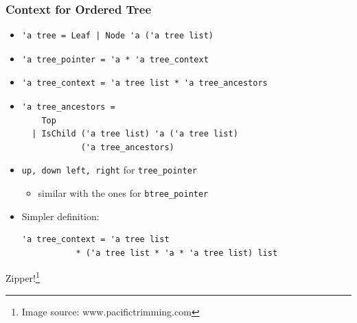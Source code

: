 \begin{frame}
\frametitle{Context for Ordered Tree}

\begin{itemize}
\item
\begin{lstlisting}
'a tree = Leaf | Node 'a ('a tree list)
\end{lstlisting}

\item
\begin{lstlisting}
'a tree_pointer = 'a * 'a tree_context
\end{lstlisting}

\item 
\begin{lstlisting}
'a tree_context = 'a tree list * 'a tree_ancestors
\end{lstlisting}

\item 
\begin{lstlisting}
'a tree_ancestors =
    Top
  | IsChild ('a tree list) 'a ('a tree list)
            ('a tree_ancestors)
\end{lstlisting}

\item \lstinline|up, down left, right| for \lstinline|tree_pointer|
\begin{itemize}
\item  similar with the ones for \lstinline|btree_pointer|
\end{itemize}

\item 
Simpler definition:\\
\begin{lstlisting}
'a tree_context = 'a tree list
           * ('a tree list * 'a * 'a tree list) list
\end{lstlisting}
\end{itemize}

\framebreak

Zipper!\footnote[frame]{Image source: www.pacifictrimming.com}


\end{frame}

